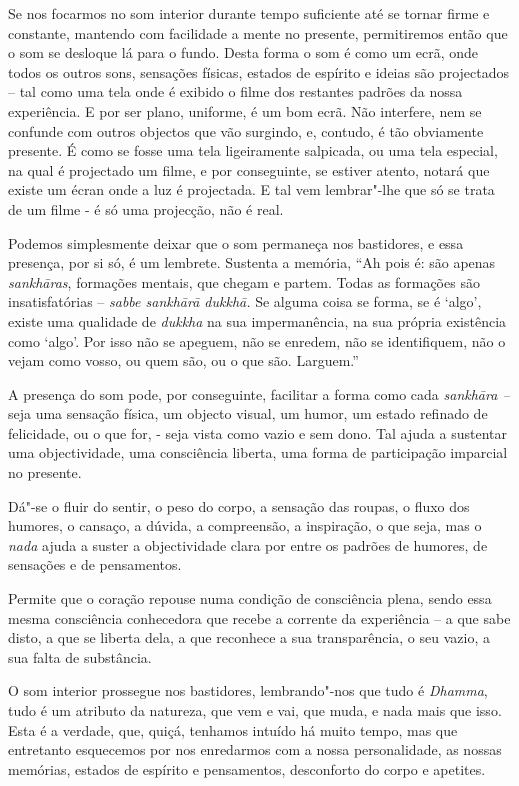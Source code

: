 Se nos focarmos no som interior durante tempo suficiente até se tornar
firme e constante, mantendo com facilidade a mente no presente,
permitiremos então que o som se desloque lá para o fundo. Desta forma o
som é como um ecrã, onde todos os outros sons, sensações físicas,
estados de espírito e ideias são projectados -- tal como uma tela onde é
exibido o filme dos restantes padrões da nossa experiência. E por ser
plano, uniforme, é um bom ecrã. Não interfere, nem se confunde com
outros objectos que vão surgindo, e, contudo, é tão obviamente presente.
É como se fosse uma tela ligeiramente salpicada, ou uma tela especial,
na qual é projectado um filme, e por conseguinte, se estiver atento,
notará que existe um écran onde a luz é projectada. E tal vem
lembrar"-lhe que só se trata de um filme - é só uma projecção, não é
real.

Podemos simplesmente deixar que o som permaneça nos bastidores, e essa
presença, por si só, é um lembrete. Sustenta a memória, ``Ah pois é: são
apenas \emph{sankhāras}, formações mentais, que chegam e partem. Todas
as formações são insatisfatórias -- \emph{sabbe sankhārā dukkhā.} Se
alguma coisa se forma, se é `algo', existe uma qualidade de
\emph{dukkha} na sua impermanência, na sua própria existência como
`algo'. Por isso não se apeguem, não se enredem, não se identifiquem,
não o vejam como vosso, ou quem são, ou o que são. Larguem.''

A presença do som pode, por conseguinte, facilitar a forma como cada
\emph{sankhāra --} seja uma sensação física, um objecto visual, um
humor, um estado refinado de felicidade, ou o que for, - seja vista como
vazio e sem dono. Tal ajuda a sustentar uma objectividade, uma
consciência liberta, uma forma de participação imparcial no presente.

Dá"-se o fluir do sentir, o peso do corpo, a sensação das roupas, o fluxo
dos humores, o cansaço, a dúvida, a compreensão, a inspiração, o que
seja, mas o \emph{nada} ajuda a suster a objectividade clara por entre
os padrões de humores, de sensações e de pensamentos.

Permite que o coração repouse numa condição de consciência plena, sendo
essa mesma consciência conhecedora que recebe a corrente da experiência
-- a que sabe disto, a que se liberta dela, a que reconhece a sua
transparência, o seu vazio, a sua falta de substância.

O som interior prossegue nos bastidores, lembrando"-nos que tudo é
\emph{Dhamma}, tudo é um atributo da natureza, que vem e vai, que muda,
e nada mais que isso. Esta é a verdade, que, quiçá, tenhamos intuído há
muito tempo, mas que entretanto esquecemos por nos enredarmos com a
nossa personalidade, as nossas memórias, estados de espírito e
pensamentos, desconforto do corpo e apetites.

